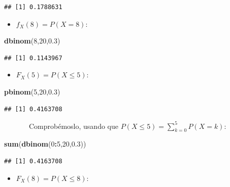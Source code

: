 \documentclass[]{book}
\newenvironment{Shaded}{\begin{snugshade}}{\end{snugshade}}
\newcommand{\DecValTok}[1]{\textcolor[rgb]{0.00,0.00,0.81}{#1}}
\newcommand{\FloatTok}[1]{\textcolor[rgb]{0.00,0.00,0.81}{#1}}
\newcommand{\KeywordTok}[1]{\textcolor[rgb]{0.13,0.29,0.53}{\textbf{#1}}}
\newcommand{\NormalTok}[1]{#1}
\newcommand{\OperatorTok}[1]{\textcolor[rgb]{0.81,0.36,0.00}{\textbf{#1}}}
\providecommand{\tightlist}{%
  \setlength{\itemsep}{0pt}\setlength{\parskip}{0pt}}
\theoremstyle{definition}
\theoremstyle{definition}
\theoremstyle{definition}
\theoremstyle{remark}
\begin{document}
\begin{verbatim}
## [1] 0.1788631
\end{verbatim}

\begin{itemize}
\tightlist
\item
  \(f_X(8)=P(X=8)\):
\end{itemize}

\begin{Shaded}
\begin{Highlighting}[]
\KeywordTok{dbinom}\NormalTok{(}\DecValTok{8}\NormalTok{,}\DecValTok{20}\NormalTok{,}\FloatTok{0.3}\NormalTok{)  }
\end{Highlighting}
\end{Shaded}

\begin{verbatim}
## [1] 0.1143967
\end{verbatim}

\begin{itemize}
\tightlist
\item
  \(F_X(5)=P(X\leqslant 5)\):
\end{itemize}

\begin{Shaded}
\begin{Highlighting}[]
\KeywordTok{pbinom}\NormalTok{(}\DecValTok{5}\NormalTok{,}\DecValTok{20}\NormalTok{,}\FloatTok{0.3}\NormalTok{)  }
\end{Highlighting}
\end{Shaded}

\begin{verbatim}
## [1] 0.4163708
\end{verbatim}

~~~~~~~Comprobémoslo, usando que \(P(X\leqslant 5)=\sum_{k=0}^5 P(X=k)\):

\begin{Shaded}
\begin{Highlighting}[]
\KeywordTok{sum}\NormalTok{(}\KeywordTok{dbinom}\NormalTok{(}\DecValTok{0}\OperatorTok{:}\DecValTok{5}\NormalTok{,}\DecValTok{20}\NormalTok{,}\FloatTok{0.3}\NormalTok{))}
\end{Highlighting}
\end{Shaded}

\begin{verbatim}
## [1] 0.4163708
\end{verbatim}

\begin{itemize}
\tightlist
\item
  \(F_X(8)=P(X\leqslant 8)\):
\end{itemize}
\end{document}
